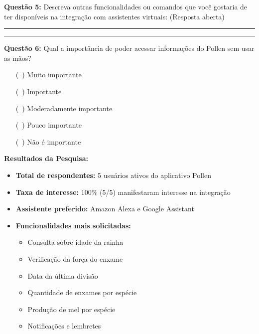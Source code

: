 \vspace{1em}

\textbf{Questão 5:} Descreva outras funcionalidades ou comandos que você gostaria de ter disponíveis na integração com assistentes virtuais: (Resposta aberta)

\vspace{3em}
\noindent\rule{\textwidth}{0.4pt}

\vspace{3em}
\noindent\rule{\textwidth}{0.4pt}

\vspace{1em}

\textbf{Questão 6:} Qual a importância de poder acessar informações do Pollen sem usar as mãos?

\begin{itemize}
    \item[($\,\,\,$)] Muito importante
    \item[($\,\,\,$)] Importante
    \item[($\,\,\,$)] Moderadamente importante
    \item[($\,\,\,$)] Pouco importante
    \item[($\,\,\,$)] Não é importante
\end{itemize}

\vspace{1em}

\textbf{Resultados da Pesquisa:}

\begin{itemize}
    \item \textbf{Total de respondentes:} 5 usuários ativos do aplicativo Pollen
    \item \textbf{Taxa de interesse:} 100\% (5/5) manifestaram interesse na integração
    \item \textbf{Assistente preferido:} Amazon Alexa e Google Assistant
    \item \textbf{Funcionalidades mais solicitadas:}
    \begin{itemize}
        \item Consulta sobre idade da rainha
        \item Verificação da força do enxame
        \item Data da última divisão
        \item Quantidade de enxames por espécie
        \item Produção de mel por espécie
        \item Notificações e lembretes
    \end{itemize}
\end{itemize}

